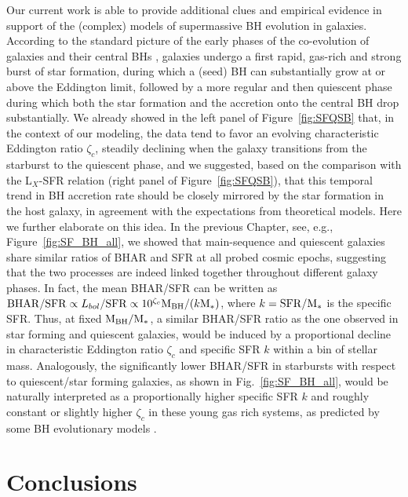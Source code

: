 Our current work is able to provide additional clues and empirical evidence in support of the (complex) models of supermassive BH evolution in galaxies. According to the standard picture of the early phases of the co-evolution of galaxies and their central BHs \citep[e.g.,][]{Granato06,Hopkins06,Lapi18}, galaxies undergo a first rapid, gas-rich and strong burst of star formation, during which a (seed) BH can substantially grow at or above the Eddington limit, followed by a more regular and then quiescent phase during which both the star formation and the accretion onto the central BH drop substantially. We already showed in the left panel of Figure~\ref{fig:SFQSB} that, in the context of our modeling, the data tend to favor an evolving characteristic Eddington ratio $\zeta_c$, steadily declining when the galaxy transitions from the starburst to the quiescent phase, and we suggested, based on the comparison with the L$_X$-SFR relation (right panel of Figure~\ref{fig:SFQSB}), that this temporal trend in BH accretion rate should be closely mirrored by the star formation in the host galaxy, in agreement with the expectations from theoretical models. Here we further elaborate on this idea.
In the previous Chapter, see, e.g., Figure~\ref{fig:SF_BH_all}, we showed that main-sequence and quiescent galaxies share similar ratios of BHAR and SFR at all probed cosmic epochs, suggesting that the two processes are indeed linked together throughout different galaxy phases.  
In fact, the mean BHAR/SFR can be written as ${\rm BHAR/SFR} \propto L_{bol}/{\rm SFR} \propto 10^{\zeta_c} {\rm M}_{\rm BH}/(k {\rm M}_*)$, where $k={\rm SFR}/{\rm M}_*$ is the specific SFR. Thus, at fixed ${\rm M}_{\rm BH}/{\rm M}_*$, a similar BHAR/SFR ratio as the one observed in star forming and quiescent galaxies, would be induced by a proportional decline in characteristic Eddington ratio $\zeta_c$ and specific SFR $k$ within a bin of stellar mass. Analogously, the significantly lower BHAR/SFR in starbursts with respect to quiescent/star forming galaxies, as shown in Fig.~\ref{fig:SF_BH_all}, would be naturally interpreted as a proportionally higher specific SFR $k$ %
and roughly constant or slightly higher $\zeta_c$ in these young gas rich systems, as predicted by some BH evolutionary models \citep[e.g.,][]{Aversa15}.

\section{Conclusions}\label{sec:concl}

